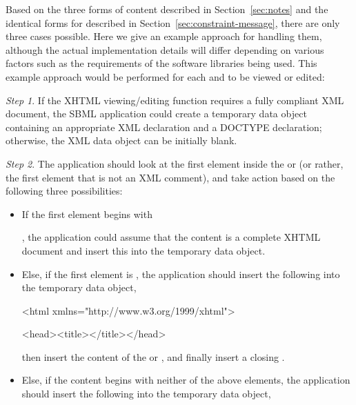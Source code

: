 Based on the three forms of \SBase {} content described in
Section~\ref{sec:notes} and the identical forms for
\Constraint {} described in Section~\ref{sec:constraint-message},
there are only three cases possible.
Here we give an example approach for handling them, although the
actual implementation details will differ depending on various
factors such as the requirements of the software libraries being
used.  This example approach would be performed for each
 and  to be viewed or edited:
\begin{description}
  
\item \emph{Step 1}. If the XHTML viewing/editing function
  requires a fully compliant XML document, the SBML application
  could create a temporary data object containing an appropriate
  XML declaration and a DOCTYPE declaration; otherwise, the XML
  data object can be initially blank.
  
\item \emph{Step 2}. The application should look at the first
  element inside the  or 
  (or rather, the first element
  that is not an XML comment), and take action based on the
  following three possibilities:
  \begin{itemize}\setlength{\parskip}{1.5ex}
    
  \item If the first element begins with
    \begin{blockChanged}\end{blockChanged}, the
    application could assume that the content is a complete XHTML
    document and insert this into the temporary data object.
    
  \item Else, if the first element is , the
    application should insert the following into the temporary
    data object, 

    \begin{example}
\begin{blockChanged}<html xmlns="http://www.w3.org/1999/xhtml">\end{blockChanged}
    <head><title></title></head>\end{example}
    then insert the content of the  
    or , and finally
    insert a closing .
    
  \item Else, if the content begins with neither of
    the above elements, the application should insert the
    following into the temporary data object,


\end{itemize}
\end{description}
